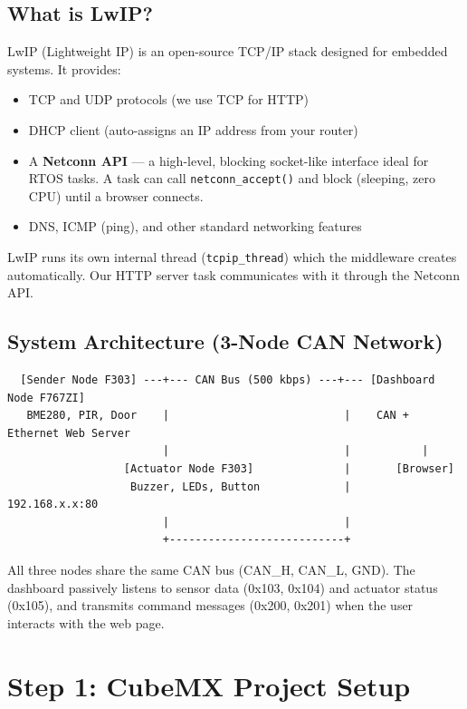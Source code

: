 \documentclass[11pt,a4paper]{article}
\begin{document}
\subsection*{What is LwIP?}
LwIP (Lightweight IP) is an open-source TCP/IP stack designed for embedded systems. It provides:
\begin{itemize}[leftmargin=2em]
  \item TCP and UDP protocols (we use TCP for HTTP)
  \item DHCP client (auto-assigns an IP address from your router)
  \item A \textbf{Netconn API} --- a high-level, blocking socket-like interface ideal for RTOS tasks. A task can call \texttt{netconn\_accept()} and block (sleeping, zero CPU) until a browser connects.
  \item DNS, ICMP (ping), and other standard networking features
\end{itemize}

LwIP runs its own internal thread (\texttt{tcpip\_thread}) which the middleware creates automatically. Our HTTP server task communicates with it through the Netconn API.

\subsection*{System Architecture (3-Node CAN Network)}
\begin{verbatim}
  [Sender Node F303] ---+--- CAN Bus (500 kbps) ---+--- [Dashboard Node F767ZI]
   BME280, PIR, Door    |                           |    CAN + Ethernet Web Server
                        |                           |           |
                  [Actuator Node F303]              |       [Browser]
                   Buzzer, LEDs, Button             |    192.168.x.x:80
                        |                           |
                        +---------------------------+
\end{verbatim}

All three nodes share the same CAN bus (CAN\_H, CAN\_L, GND). The dashboard passively listens to sensor data (0x103, 0x104) and actuator status (0x105), and transmits command messages (0x200, 0x201) when the user interacts with the web page.

\newpage

\section{Step 1: CubeMX Project Setup}
\end{document}

